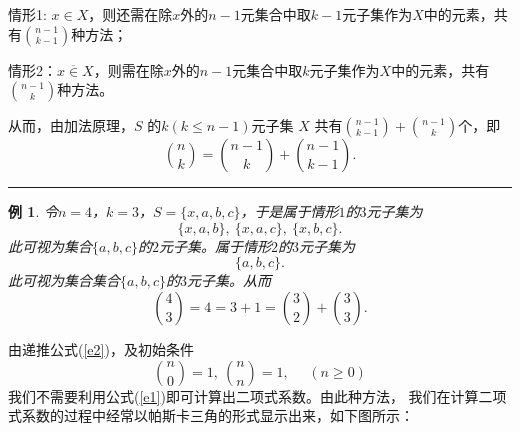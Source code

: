 \documentclass[a4paper,11pt,twoside]{book}
\newtheorem{exa}[thm]{例}
\def\qed{\nopagebreak\hfill{\rule{4pt}{7pt}}\medbreak}
\begin{document}
情形1: $x\in
X$，则还需在除$x$外的$n-1$元集合中取$k-1$元子集作为$X$中的元素，共有${n-1
\choose k-1}$种方法；

情形2：$x\overline{\in}
X$，则需在除$x$外的$n-1$元集合中取$k$元子集作为$X$中的元素，共有${n-1
\choose k}$种方法。

从而，由加法原理，$S$ 的$k(k\leq n-1)$元子集 $X$ 共有${n-1 \choose
k-1}+{n-1 \choose k}$个，即
$${n\choose k}={n-1 \choose k}+{n-1\choose k-1}.$$
\qed
\begin{exa}
令$n=4$，$k=3$，$S=\{x,a,b,c\}$，于是属于情形$1$的$3$元子集为$$\{x,a,b\},\
\{x,a,c\},\
\{x,b,c\}.$$此可视为集合$\{a,b,c\}$的$2$元子集。属于情形$2$的$3$元子集为$$\{a,b,c\}.$$
此可视为集合集合$\{a,b,c\}$的$3$元子集。从而$${4 \choose
3}=4=3+1={3\choose 2}+{3\choose 3}.$$
\end{exa}

由递推公式(\ref{e2})，及初始条件$${n \choose 0}=1,\ {n\choose n}=1,
\ \ \ \ \ \ (n\geq
0)$$我们不需要利用公式(\ref{e1})即可计算出二项式系数。由此种方法，
我们在计算二项式系数的过程中经常以帕斯卡三角的形式显示出来，如下图所示：
\end{document}
